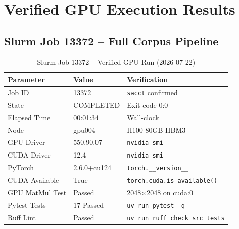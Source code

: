 \documentclass[11pt,a4paper]{article}
\begin{document}
\section{Verified GPU Execution Results}
\label{sec:gpu_results}

\subsection{Slurm Job 13372 -- Full Corpus Pipeline}
\begin{table}[H]
\centering
\caption{Slurm Job 13372 -- Verified GPU Run (2026-07-22)}
\label{tab:slurm_13372}
\begin{tabular}{>{\color{nvidiaWhite}}l >{\color{nvidiaWhite}}l >{\color{nvidiaWhite}}l}
\rowcolor{tableHeader}
\textbf{Parameter} & \textbf{Value} & \textbf{Verification} \\
\midrule
Job ID & 13372 & \texttt{sacct} confirmed \\
State & COMPLETED & Exit code 0:0 \\
Elapsed Time & 00:01:34 & Wall-clock \\
Node & gpu004 & H100 80GB HBM3 \\
GPU Driver & 550.90.07 & \texttt{nvidia-smi} \\
CUDA Driver & 12.4 & \texttt{nvidia-smi} \\
PyTorch & 2.6.0+cu124 & \texttt{torch.\_\_version\_\_} \\
CUDA Available & True & \texttt{torch.cuda.is\_available()} \\
GPU MatMul Test & Passed & 2048$\times$2048 on cuda:0 \\
Pytest Tests & 17 Passed & \texttt{uv run pytest -q} \\
Ruff Lint & Passed & \texttt{uv run ruff check src tests} \\
\bottomrule
\end{tabular}
\end{table}
\end{document}

